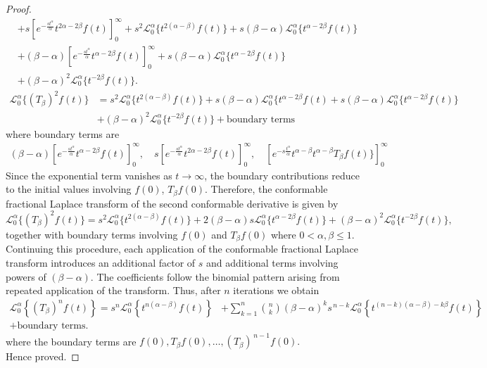 \documentclass[10pt,a4paper]{amsart}
\begin{document}
\begin{proof}
\begin{align*}
& + s\left[e^{-\frac{s t^{\alpha}}{\alpha}} t^{2\alpha-2\beta}f(t)\right]_{0}^{\infty}
+s^2\mathcal{L}_0^{\alpha}\{t^{2(\alpha-\beta)}f(t)\}
+s(\beta-\alpha)\mathcal{L}_0^{\alpha}\{t^{\alpha-2\beta}f(t)\}\\
&+ (\beta-\alpha)\left[e^{-\frac{s t^{\alpha}}{\alpha}} t^{\alpha-2\beta}f(t)\right]_{0}^{\infty}
+s(\beta-\alpha)\mathcal{L}_0^{\alpha}\{t^{\alpha-2\beta}f(t)\}\\
&+(\beta-\alpha)^2\mathcal{L}_0^{\alpha}\{t^{-2\beta}f(t)\}.
\end{align*}
\begin{align*}
\mathcal{L}_0^{\alpha}\{(T_{\beta})^{2}f(t)\}
&=s^2\mathcal{L}_0^{\alpha}\{t^{2(\alpha-\beta)}f(t)\}
+s(\beta-\alpha)\mathcal{L}_0^{\alpha}\{t^{\alpha-2\beta}f(t)
+s(\beta-\alpha)\mathcal{L}_0^{\alpha}\{t^{\alpha-2\beta}f(t)\}\\
&+(\beta-\alpha)^2\mathcal{L}_0^{\alpha}\{t^{-2\beta}f(t)\}
+ \text{boundary terms}
\end{align*}
where boundary terms are
\begin{align*}
 (\beta-\alpha)\left[e^{-\frac{s t^{\alpha}}{\alpha}} t^{\alpha-2\beta}f(t)\right]_{0}^{\infty},\quad
 s\left[e^{-\frac{s t^{\alpha}}{\alpha}} t^{2\alpha-2\beta}f(t)\right]_{0}^{\infty},
 \quad\left[e^{-s\frac{t^{\alpha}}{\alpha}}t^{\alpha-\beta}t^{\alpha-\beta}T_{\beta}f(t)\}\right]_{0}^{\infty}
\end{align*}
Since the exponential term vanishes as $t \to \infty$, the boundary contributions reduce to the initial values involving
$
f(0)$, $T_{\beta}f(0).$
 Therefore, the conformable fractional Laplace transform of the second conformable derivative is given by
\[
\mathcal{L}_0^{\alpha}\{(T_{\beta})^{2}f(t)\}
=
s^{2}\mathcal{L}_0^{\alpha}\{t^{2(\alpha-\beta)}f(t)\}
+2(\beta-\alpha)s\mathcal{L}_0^{\alpha}\{t^{\alpha-2\beta}f(t)\}
+(\beta-\alpha)^{2}\mathcal{L}_0^{\alpha}\{t^{-2\beta}f(t)\},
\]
together with boundary terms involving $f(0)$ and $T_{\beta}f(0)$ where $0<\alpha,\beta\le1$.\\
Continuing this procedure, each application of the conformable fractional Laplace transform introduces an additional factor of $s$ and additional terms involving powers of $(\beta-\alpha)$. The coefficients follow the binomial pattern arising from repeated application of the transform.
Thus, after $n$ iterations we obtain
\begin{align*}
\mathcal{L}_0^{\alpha} \left\{ (T_\beta)^n f(t) \right\} = s^n \mathcal{L}_0^{\alpha} \left\{ t^{n(\alpha-\beta)} f(t) \right\} 
&+ \sum_{k=1}^n \binom{n}{k} (\beta-\alpha)^k s^{\,n-k} \mathcal{L}_0^{\alpha} \left\{ t^{(n-k)(\alpha-\beta)-k\beta} f(t) \right\} \\
+ \text{boundary terms}.
\end{align*}
where the boundary terms are
$
f(0), T_\beta f(0), \ldots, (T_\beta)^{\,n-1} f(0).
$\\
Hence proved. 
\end{proof}
\end{document}
